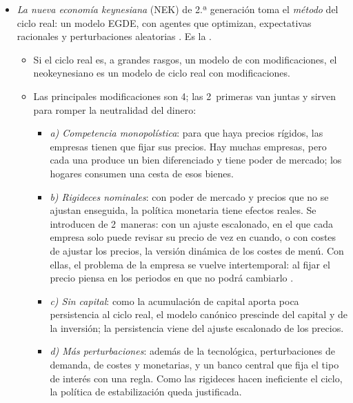 \documentclass[11pt]{article}
\begin{document}
\begin{itemize}
\item \emph{La nueva economía keynesiana} (NEK) de 2.ª generación toma el \emph{método} del ciclo real: un modelo EGDE, con agentes que optimizan, expectativas racionales y perturbaciones aleatorias\nocite{DeVroey2016History,GoodfriendKing1997New} . Es la .
  \begin{itemize}
  \item Si el ciclo real es, a grandes rasgos, un modelo de  con modificaciones, el neokeynesiano es un modelo de ciclo real con modificaciones.
  \item Las principales modificaciones son 4; las 2~primeras van juntas y sirven para romper la neutralidad del dinero\nocite{Romer2019Advanced}:
    \begin{itemize}
    \item \emph{a) Competencia monopolística}: para que haya precios rígidos, las empresas tienen que fijar sus precios. Hay muchas empresas, pero cada una produce un bien diferenciado y tiene poder de mercado; los hogares consumen una cesta de esos bienes\nocite{DixitStiglitz1977Monopolistic}.
    \item \emph{b) Rigideces nominales}: con poder de mercado y precios que no se ajustan enseguida, la política monetaria tiene efectos reales. Se introducen de 2~maneras: con un ajuste escalonado, en el que cada empresa solo puede revisar su precio de vez en cuando\nocite{Calvo1983Staggered}, o con costes de ajustar los precios, la versión dinámica de los costes de menú\nocite{Rotemberg1982Monopolistic}. Con ellas, el problema de la empresa se vuelve intertemporal: al fijar el precio piensa en los periodos en que no podrá cambiarlo .
    \item \emph{c) Sin capital}: como la acumulación de capital aporta poca persistencia al ciclo real\nocite{CogleyNason1995Output}, el modelo canónico prescinde del capital y de la inversión; la persistencia viene del ajuste escalonado de los precios.
    \item \emph{d) Más perturbaciones}: además de la tecnológica, perturbaciones de demanda, de costes y monetarias, y un banco central que fija el tipo de interés con una regla. Como las rigideces hacen ineficiente el ciclo, la política de estabilización queda justificada.
    \end{itemize}
  \end{itemize}
\end{itemize}
\end{document}
